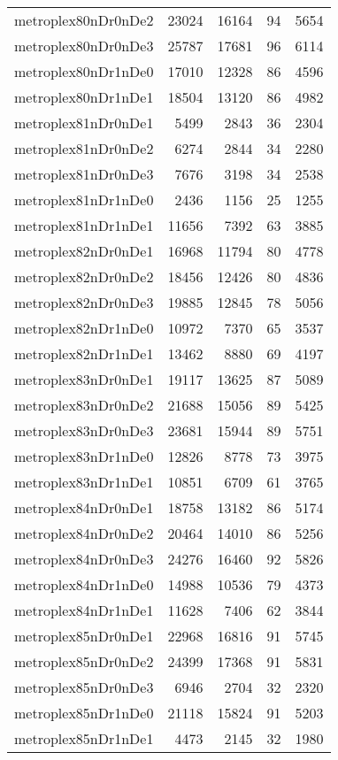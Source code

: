 \begin{tabular}{lrrrr}
metroplex80nDr0nDe2 & 23024 & 16164 & 94 & 5654 \\
metroplex80nDr0nDe3 & 25787 & 17681 & 96 & 6114 \\
metroplex80nDr1nDe0 & 17010 & 12328 & 86 & 4596 \\
metroplex80nDr1nDe1 & 18504 & 13120 & 86 & 4982 \\
metroplex81nDr0nDe1 & 5499 & 2843 & 36 & 2304 \\
metroplex81nDr0nDe2 & 6274 & 2844 & 34 & 2280 \\
metroplex81nDr0nDe3 & 7676 & 3198 & 34 & 2538 \\
metroplex81nDr1nDe0 & 2436 & 1156 & 25 & 1255 \\
metroplex81nDr1nDe1 & 11656 & 7392 & 63 & 3885 \\
metroplex82nDr0nDe1 & 16968 & 11794 & 80 & 4778 \\
metroplex82nDr0nDe2 & 18456 & 12426 & 80 & 4836 \\
metroplex82nDr0nDe3 & 19885 & 12845 & 78 & 5056 \\
metroplex82nDr1nDe0 & 10972 & 7370 & 65 & 3537 \\
metroplex82nDr1nDe1 & 13462 & 8880 & 69 & 4197 \\
metroplex83nDr0nDe1 & 19117 & 13625 & 87 & 5089 \\
metroplex83nDr0nDe2 & 21688 & 15056 & 89 & 5425 \\
metroplex83nDr0nDe3 & 23681 & 15944 & 89 & 5751 \\
metroplex83nDr1nDe0 & 12826 & 8778 & 73 & 3975 \\
metroplex83nDr1nDe1 & 10851 & 6709 & 61 & 3765 \\
metroplex84nDr0nDe1 & 18758 & 13182 & 86 & 5174 \\
metroplex84nDr0nDe2 & 20464 & 14010 & 86 & 5256 \\
metroplex84nDr0nDe3 & 24276 & 16460 & 92 & 5826 \\
metroplex84nDr1nDe0 & 14988 & 10536 & 79 & 4373 \\
metroplex84nDr1nDe1 & 11628 & 7406 & 62 & 3844 \\
metroplex85nDr0nDe1 & 22968 & 16816 & 91 & 5745 \\
metroplex85nDr0nDe2 & 24399 & 17368 & 91 & 5831 \\
metroplex85nDr0nDe3 & 6946 & 2704 & 32 & 2320 \\
metroplex85nDr1nDe0 & 21118 & 15824 & 91 & 5203 \\
metroplex85nDr1nDe1 & 4473 & 2145 & 32 & 1980 \\

\end{tabular}
